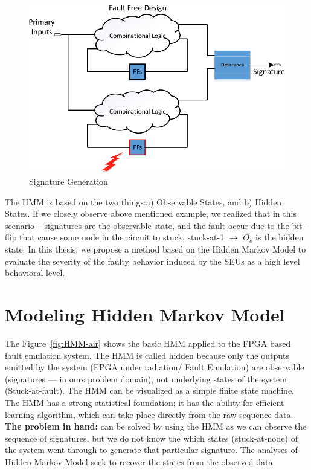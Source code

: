  \begin{figure}[tb!]

 \centering
  \captionsetup{justification=centering}    
   \includegraphics[scale=0.8]{Figures/signature1.pdf}
   \caption{Signature Generation}
\label{fig:SG}
\end{figure}

The HMM is based on  the two things:a) Observable States, and b) Hidden States. If we closely observe above mentioned example, we realized that in this scenario --  signatures are the observable state, and the fault occur due to the bit-flip that cause some node in the circuit to stuck, stuck-at-1 $\rightarrow$ $O_o$ is the hidden state. In this thesis, we propose a method based on the Hidden Markov Model to evaluate the severity of the faulty behavior induced by the SEUs as a high level behavioral level. 







\section{Modeling Hidden Markov Model}

The Figure~\ref{fig:HMM-air} shows the basic HMM applied to the FPGA based fault emulation system. The HMM is called hidden because only the outputs emitted by the system (FPGA under radiation/ Fault Emulation) are observable (signatures --- in ours problem domain), not underlying states of the system (Stuck-at-fault). The HMM can be visualized as a simple finite state machine. The HMM has a strong statistical foundation; it has the ability for efficient learning algorithm, which can take place directly from the raw sequence data. \textbf{The problem in hand:} can be solved by using the HMM as we can observe the sequence of signatures, but we do not know the which states (stuck-at-node) of the system went through to generate that particular signature. The analyses of Hidden Markov Model seek to recover the states from the observed data.

